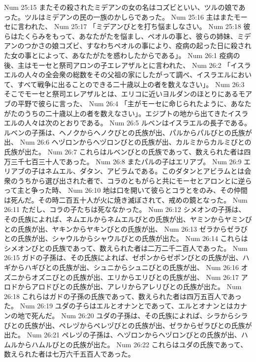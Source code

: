 Num 25:15  またその殺されたミデアンの女の名はコズビといい、ツルの娘であった。ツルはミデアンの民の一族のかしらであった。
Num 25:16  主はまたモーセに言われた、
Num 25:17  「ミデアンびとを打ち悩ましなさい。
Num 25:18  彼らはたくらみをもって、あなたがたを悩まし、ペオルの事と、彼らの姉妹、ミデアンのつかさの娘コズビ、すなわちペオルの事により、疫病の起った日に殺された女の事とによって、あなたがたを惑わしたからである」。
Num 26:1  疫病の後、主はモーセと祭司アロンの子エレアザルとに言われた、
Num 26:2  「イスラエルの人々の全会衆の総数をその父祖の家にしたがって調べ、イスラエルにおいて、すべて戦争に出ることのできる二十歳以上の者を数えなさい」。
Num 26:3  そこでモーセと祭司エレアザルとは、エリコに近いヨルダンのほとりにあるモアブの平野で彼らに言った、
Num 26:4  「主がモーセに命じられたように、あなたがたのうちの二十歳以上の者を数えなさい」。エジプトの地から出てきたイスラエルの人々は次のとおりである。
Num 26:5  ルベンはイスラエルの長子である。ルベンの子孫は、ヘノクからヘノクびとの氏族が出、パルからパルびとの氏族が出、
Num 26:6  ヘヅロンからヘヅロンびとの氏族が出、カルミからカルミびとの氏族が出た。
Num 26:7  これらはルベンびとの氏族であって、数えられた者は四万三千七百三十人であった。
Num 26:8  またパルの子はエリアブ。
Num 26:9  エリアブの子はネムエル、ダタン、アビラムである。このダタンとアビラムとは会衆のうちから選び出された者で、コラのともがらと共にモーセとアロンとに逆らって主と争った時、
Num 26:10  地は口を開いて彼らとコラとをのみ、その仲間は死んだ。その時二百五十人が火に焼き滅ぼされて、戒めの鏡となった。
Num 26:11  ただし、コラの子たちは死ななかった。
Num 26:12  シメオンの子孫は、その氏族によれば、ネムエルからネムエルびとの氏族が出、ヤミンからヤミンびとの氏族が出、ヤキンからヤキンびとの氏族が出、
Num 26:13  ゼラからゼラびとの氏族が出、シャウルからシャウルびとの氏族が出た。
Num 26:14  これらはシメオンびとの氏族であって、数えられた者は二万二千二百人であった。
Num 26:15  ガドの子孫は、その氏族によれば、ゼポンからゼポンびとの氏族が出、ハギからハギびとの氏族が出、シュニからシュニびとの氏族が出、
Num 26:16  オズニからオズニびとの氏族が出、エリからエリびとの氏族が出、
Num 26:17  アロドからアロドびとの氏族が出、アレリからアレリびとの氏族が出た。
Num 26:18  これらはガドの子孫の氏族であって、数えられた者は四万五百人であった。
Num 26:19  ユダの子らはエルとオナンとであって、エルとオナンとはカナンの地で死んだ。
Num 26:20  ユダの子孫は、その氏族によれば、シラからシラびとの氏族が出、ペレヅからペレヅびとの氏族が出、ゼラからゼラびとの氏族が出た。
Num 26:21  ペレヅの子孫は、ヘヅロンからヘヅロンびとの氏族が出、ハムルからハムルびとの氏族が出た。
Num 26:22  これらはユダの氏族であって、数えられた者は七万六千五百人であった。
